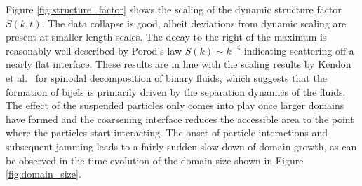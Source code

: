 Figure \ref{fig:structure_factor} shows the scaling of the dynamic
structure factor \(S(k,t)\). The data collapse is good, albeit
deviations from dynamic scaling are present at smaller length scales.
The decay to the right of the maximum is reasonably well described by
Porod's law \(S(k)\sim k^{-4}\) indicating scattering off a nearly flat
interface. These results are in line with the scaling results by Kendon
et al.~\cite{kendon_3d_1999, kendon_inertial_2001} for spinodal
decomposition of binary fluids, which suggests that the formation of
bijels is primarily driven by the separation dynamics of the fluids. The
effect of the suspended particles only comes into play once larger
domains have formed and the coarsening interface reduces the accessible
area to the point where the particles start interacting. The onset of
particle interactions and subsequent jamming leads to a fairly sudden
slow-down of domain growth, as can be observed in the time evolution of
the domain size shown in Figure \ref{fig:domain_size}.

